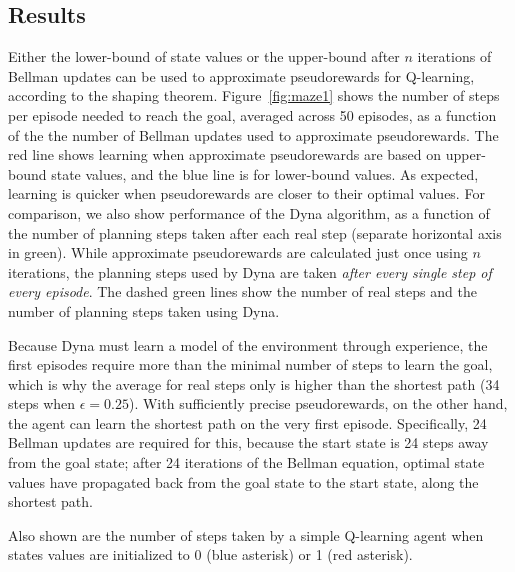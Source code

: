 \documentclass[letterpaper]{article}
\begin{document}
\subsection{Results}

Either the lower-bound of state values or the upper-bound after $n$ iterations of Bellman updates can be used to approximate pseudorewards for Q-learning, according to the shaping theorem. Figure~\ref{fig:maze1} shows the number of steps per episode needed to reach the goal, averaged across 50 episodes, as a function of the the number of Bellman updates used to approximate pseudorewards. The red line shows learning when approximate pseudorewards are based on upper-bound state values, and the blue line is for lower-bound values. As expected, learning is quicker when pseudorewards are closer to their optimal values. For comparison, we also show performance of the Dyna algorithm, as a function of the number of planning steps taken after each real step (separate horizontal axis in green). While approximate pseudorewards are calculated just once using $n$ iterations, the planning steps used by Dyna are taken \textit{after every single step of every episode}. The dashed green lines show the number of real steps and the number of planning steps taken using Dyna.

Because Dyna must learn a model of the environment through experience, the first episodes require more than the minimal number of steps to learn the goal, which is why the average for real steps only is higher than the shortest path (34 steps when $\epsilon=0.25$). With sufficiently precise pseudorewards, on the other hand, the agent can learn the shortest path on the very first episode. Specifically, 24 Bellman updates are required for this, because the start state is 24 steps away from the goal state; after 24 iterations of the Bellman equation, optimal state values have propagated back from the goal state to the start state, along the shortest path.

Also shown are the number of steps taken by a simple Q-learning agent when states values are initialized to 0 (blue asterisk) or 1 (red asterisk).
\end{document}
